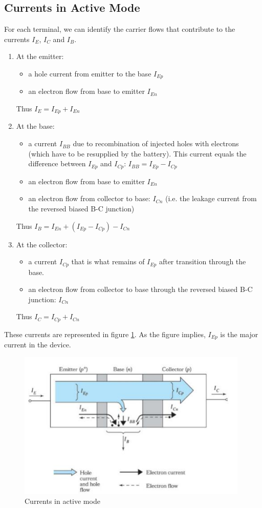 \subsection{Currents in Active Mode}
For each terminal, we can identify the carrier flows that contribute to the currents $I_E$, $I_C$ and $I_B$.
\begin{enumerate}
    \item At the emitter:
    \begin{itemize}
        \item a hole current from emitter to the base $I_{Ep}$
        \item an electron flow from base to emitter $I_{En}$
    \end{itemize}
    Thus $I_E = I_{Ep} + I_{En}$
    \item At the base:
    \begin{itemize}
        \item a current $I_{BB}$ due to recombination of injected holes with electrons (which have to be resupplied by the battery). This current equals the difference between $I_{Ep}$ and $I_{Cp}$: $I_{BB} = I_{Ep} - I_{Cp}$
        \item an electron flow from base to emitter $I_{En}$
        \item an electron flow from collector to base: $I_{Cn}$ (i.e. the leakage current from the reversed biased B-C junction)
    \end{itemize}
    Thus $I_B = I_{En} + (I_{Ep} - I_{Cp}) - I_{Cn}$
    \item At the collector:
    \begin{itemize}
        \item a current $I_{Cp}$ that is what remains of $I_{Ep}$ after transition through the base.
        \item an electron flow from collector to base through the reversed biased B-C junction: $I_{Cn}$ 
    \end{itemize}
    Thus $I_C = I_{Cp} + I_{Cn}$
\end{enumerate}
These currents are represented in figure \ref{fig:bjt4}. As the figure implies, $I_{Ep}$ is the major current in the device.

\begin{figure}[h!]
\centering
\includegraphics[width=11cm]{figures/ch01/bjt4.jpg}
\caption{Currents in active mode} 
\label{fig:bjt4}
\end{figure}

